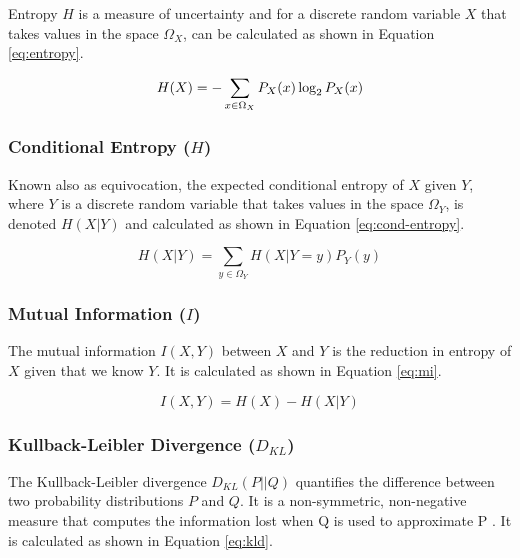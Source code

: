 \documentclass[a4paper,11pt]{article}
\begin{document}
Entropy $H$ is a measure of uncertainty and for a discrete random variable $X$ that takes values in the space $\Omega_X$, can be calculated as shown in Equation \ref{eq:entropy}.

\begin{equation} \label{eq:entropy}
H(X) = - \sum_{x \in \Omega_X}P_X(x) \log_2 P_X(x)\\[2.5mm]
\end{equation}

\subsubsection{Conditional Entropy ($H$)}
\label{sec:bg:cond-entropy}

Known also as equivocation, the expected conditional entropy of $X$ given $Y$, where $Y$ is a discrete random variable that takes values in the space $\Omega_Y$, is denoted $H(X|Y)$ and calculated as shown in Equation \ref{eq:cond-entropy}.

\begin{equation}
\label{eq:cond-entropy}
H(X|Y) = \sum_{y \in \Omega_Y}H(X|Y=y)P_Y(y)
\end{equation}

\subsubsection{Mutual Information ($I$)}
\label{sec:bg:mi}

The mutual information $I(X,Y)$ between $X$ and $Y$ is the reduction in entropy of $X$ given that we know $Y$. It is calculated as shown in Equation \ref{eq:mi}.

\begin{equation}
\label{eq:mi}
I(X,Y) = H(X) - H(X|Y)
\end{equation}

\subsubsection{Kullback-Leibler Divergence ($D_{KL}$)}
\label{sec:bg:kld}

The Kullback-Leibler divergence $D_{KL}(P || Q)$ quantifies the difference between two probability distributions $P$ and $Q$. It is a non-symmetric, non-negative measure that computes the information lost when Q is used to approximate P \cite{Burnham2002}. It is calculated as shown in Equation \ref{eq:kld}.
\end{document}
